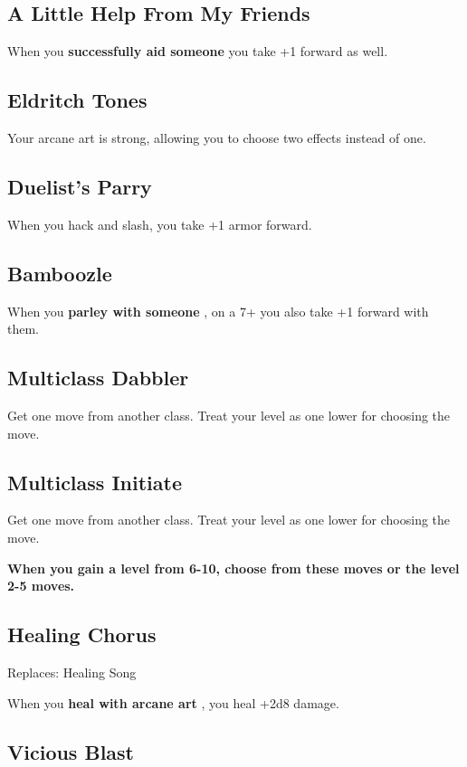 \subsection{A Little Help From My Friends}


 When you \textbf{successfully aid someone}
 you take +1 forward as well.
\subsection{Eldritch Tones}


 Your arcane art is strong, allowing you to choose two effects instead of one.
\subsection{Duelist's Parry}


 When you hack and slash, you take +1 armor forward.
\subsection{Bamboozle}


 When you \textbf{parley with someone}
, on a 7+ you also take +1 forward with them.
\subsection{Multiclass Dabbler}


 Get one move from another class. Treat your level as one lower for choosing the move.
\subsection{Multiclass Initiate}


 Get one move from another class. Treat your level as one lower for choosing the move.

\vspace{\baselineskip}
 {\bfseries When you gain a level from 6-10, choose from these moves or the level 2-5 moves.}
\subsection{Healing Chorus}


 Replaces: Healing Song


 When you \textbf{heal with arcane art}
, you heal +2d8 damage.
\subsection{Vicious Blast}


